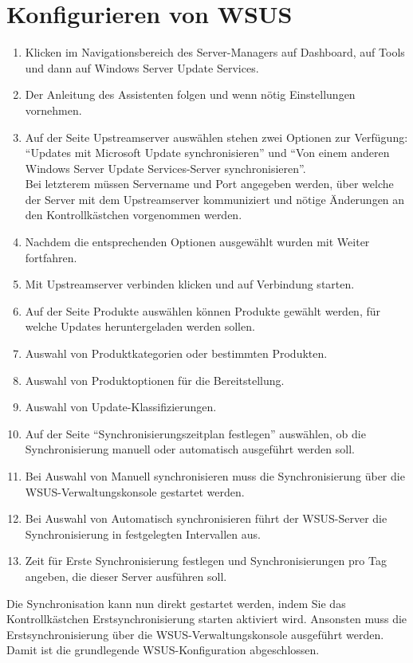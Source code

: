 \documentclass{preset/school}
\begin{document}
\section{Konfigurieren von WSUS}
\begin{enumerate}
    \item Klicken im Navigationsbereich des Server-Managers auf Dashboard, auf Tools und dann auf Windows Server Update Services.
    \item Der Anleitung des Assistenten folgen und wenn nötig Einstellungen vornehmen.
    \item Auf der Seite Upstreamserver auswählen stehen zwei Optionen zur Verfügung: ``Updates mit Microsoft Update synchronisieren'' und ``Von einem anderen Windows Server Update Services-Server synchronisieren''.\\
    Bei letzterem müssen Servername und Port angegeben werden, über welche der Server mit dem Upstreamserver kommuniziert und nötige Änderungen an den Kontrollkästchen vorgenommen werden.
    \item Nachdem die entsprechenden Optionen ausgewählt wurden mit Weiter fortfahren.
    \item Mit Upstreamserver verbinden klicken und auf Verbindung starten.
    \item Auf der Seite Produkte auswählen können Produkte gewählt werden, für welche Updates heruntergeladen werden sollen.
    \item Auswahl von Produktkategorien oder bestimmten Produkten.
    \item Auswahl von Produktoptionen für die Bereitstellung.
    \item Auswahl von Update-Klassifizierungen.
    \item Auf der Seite ``Synchronisierungszeitplan festlegen'' auswählen, ob die Synchronisierung manuell oder automatisch ausgeführt werden soll.
    \item Bei Auswahl von Manuell synchronisieren muss die Synchronisierung über die WSUS-Verwaltungskonsole gestartet werden.
    \item Bei Auswahl von Automatisch synchronisieren führt der WSUS-Server die Synchronisierung in festgelegten Intervallen aus.
    \item Zeit für Erste Synchronisierung festlegen und Synchronisierungen pro Tag angeben, die dieser Server ausführen soll.
\end{enumerate}

Die Synchronisation kann nun direkt gestartet werden, indem Sie das Kontrollkästchen Erstsynchronisierung starten aktiviert wird.
Ansonsten muss die Erstsynchronisierung über die WSUS-Verwaltungskonsole ausgeführt werden.
\\\vspace{0.5 em}
Damit ist die grundlegende WSUS-Konfiguration abgeschlossen.
\end{document}
